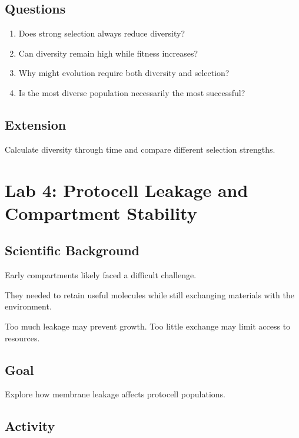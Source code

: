 \documentclass[
  oneside,
  openany]{book}
\providecommand{\tightlist}{%
  \setlength{\itemsep}{0pt}\setlength{\parskip}{0pt}}
\begin{document}
\subsection{Questions}\label{questions-2}

\begin{enumerate}
\def\labelenumi{\arabic{enumi}.}
\tightlist
\item
  Does strong selection always reduce diversity?
\item
  Can diversity remain high while fitness increases?
\item
  Why might evolution require both diversity and selection?
\item
  Is the most diverse population necessarily the most successful?
\end{enumerate}

\subsection{Extension}\label{extension-2}

Calculate diversity through time and compare different selection strengths.

\section{Lab 4: Protocell Leakage and Compartment Stability}\label{lab-4-protocell-leakage-and-compartment-stability}

\subsection{Scientific Background}\label{scientific-background-3}

Early compartments likely faced a difficult challenge.

They needed to retain useful molecules while still exchanging materials with the environment.

Too much leakage may prevent growth. Too little exchange may limit access to resources.

\subsection{Goal}\label{goal-3}

Explore how membrane leakage affects protocell populations.

\subsection{Activity}\label{activity-3}
\end{document}

